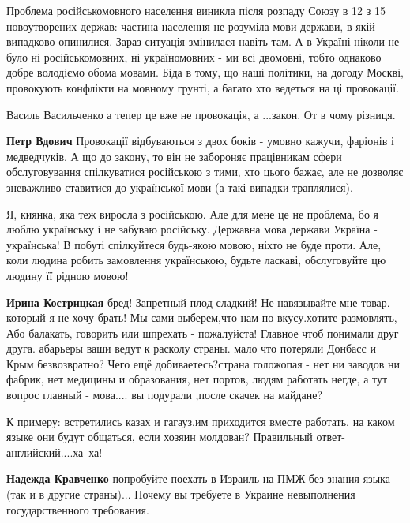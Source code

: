 \begin{itemize}

Проблема російськомовного населення виникла після розпаду Союзу в 12 з 15
новоутворених держав: частина населення не розуміла мови держави, в якій
випадково опинилися. Зараз ситуація змінилася навіть там. А в Україні ніколи не
було ні російськомовних, ні україномовних - ми всі двомовні, тобто однаково
добре володіємо обома мовами. Біда в тому, що наші політики, на догоду Москві,
провокують конфлікти на мовному грунті, а багато хто ведеться на ці провокації.

\begin{itemize}
Василь Васильченко а тепер це вже не провокація, а ...закон.
От в чому різниця.


\textbf{Петр Вдович} Провокації відбуваються з двох боків - умовно кажучи,
фаріонів і медведчуків. А що до закону, то він не забороняє працівникам сфери
обслуговування спілкуватися російською з тими, хто цього бажає, але не дозволяє
зневажливо ставитися до української мови (а такі випадки траплялися).
\end{itemize}


Я, киянка, яка теж виросла з російською. Але для мене це не проблема, бо я
люблю українську і не забуваю російську. Державна мова держави Україна -
українська! В побуті спілкуйтеся будь-якою мовою, ніхто не буде проти. Але,
коли людина робить замовлення українською, будьте ласкаві, обслуговуйте цю
людину її рідною мовою!

\begin{itemize}
\textbf{Ирина Кострицкая} бред! Запретный плод сладкий! Не навязывайте мне
товар. который я не хочу брать! Мы сами выберем,что нам по вкусу.хотите
размовлять, Або балакать, говорить или шпрехать - пожалуйста! Главное чтоб
понимали друг друга. абарьеры ваши ведут к расколу страны. мало что потеряли
Донбасс и Крым безвозвратно? Чего ещё добиваетесь?страна голожопая - нет ни
заводов ни фабрик, нет медицины и образования, нет портов, людям работать негде, а
тут вопрос главный - мова.... вы подурали ,после скачек на майдане?

К примеру: встретились казах и гагауз,им приходится вместе работать. на каком
языке они будут общаться, если хозяин молдован? Правильный ответ-
английский....ха--ха!

\textbf{Надежда Кравченко} попробуйте поехать в Израиль на ПМЖ без знания языка
(так и в другие страны)... Почему вы требуете в Украине невыполнения
государственного требования.
\end{itemize}


\end{itemize}
